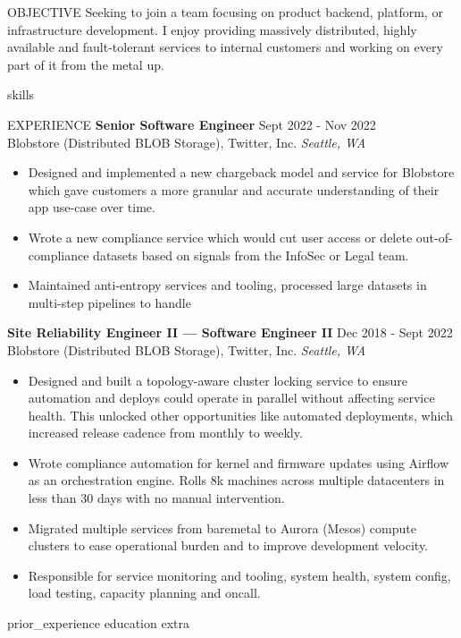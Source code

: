\documentclass{resume}
\begin{document}

\begin{rSection}{OBJECTIVE}
{Seeking to join a team focusing on product backend, platform, or infrastructure development. I enjoy providing massively distributed, highly available and fault-tolerant services to internal customers and working on every part of it from the metal up.}
\end{rSection}

{skills}
    
\begin{rSection}{EXPERIENCE}
\textbf{Senior Software Engineer} \hfill Sept 2022 - Nov 2022\\
Blobstore (Distributed BLOB Storage), Twitter, Inc. \hfill \textit{Seattle, WA}
 \begin{itemize}
    \itemsep -3pt {} 
     \item Designed and implemented a new chargeback model and service for Blobstore which gave customers a more granular and accurate understanding of their app use-case over time. 
     \item Wrote a new compliance service which would cut user access or delete out-of-compliance datasets based on signals from the InfoSec or Legal team. 
     \item Maintained anti-entropy services and tooling, processed large datasets in multi-step pipelines to handle 
 \end{itemize}

 \textbf{ Site Reliability Engineer II --- Software Engineer II} \hfill Dec 2018 - Sept 2022 \\
Blobstore (Distributed BLOB Storage), Twitter, Inc. \hfill \textit{Seattle, WA}
 \begin{itemize}
    \itemsep -3pt {} 
     \item Designed and built a topology-aware cluster locking service to ensure automation and deploys could operate in parallel without affecting service health. This unlocked other opportunities like automated deployments, which increased release cadence from monthly to weekly.
     \item Wrote compliance automation for kernel and firmware updates using Airflow as an orchestration engine. Rolls 8k machines across multiple datacenters in less than 30 days with no manual intervention. 
     \item Migrated multiple services from baremetal to Aurora (Mesos) compute clusters to ease operational burden and to improve development velocity.
     \item Responsible for service monitoring and tooling, system health, system config, load testing, capacity planning and oncall.
 \end{itemize}

\end{rSection} 


{prior_experience}
{education}
{extra}
\end{document}
